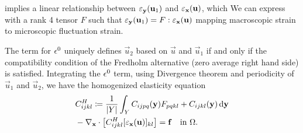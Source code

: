\documentclass[twocolumn,10pt]{article}
\begin{document}
 implies a linear relationship between
$\varepsilon_{\mathbf y}(\mathbf u_1)$ and $\varepsilon_{\mathbf x}(\mathbf u)$, which We can express
with a rank 4 tensor $F$ such that $\varepsilon_{\mathbf y}(\mathbf u_1) =
F:\varepsilon_{\mathbf x}(\mathbf u)$ mapping macroscopic strain to microscopic
fluctuation strain.

The term for $\epsilon^0$ uniquely defines $\vec{u}_2$ based on $\vec{u}$
and $\vec{u}_1$ if and only if the compatibility condition of the
Fredholm alternative (zero average right hand side) is
satisfied. Integrating the $\epsilon^0$ term, using Divergence theorem and
periodicity of $\vec{u}_1$ and $\vec{u}_2$, we have the homogenized
elasticity equation
\begin{align}
  &C^H_{ijkl} \coloneqq \frac{1}{|Y|} \int_Y C_{ijpq}({\mathbf y}) F_{pqkl} + C_{ijkl}({\mathbf y}) \, \mathrm{d} {\mathbf y}\\
  &-\nabla_{\mathbf x} \cdot \left[ C^H_{ijkl} [\varepsilon_{\mathbf x}(\mathbf u)]_{kl} \right] = \mathbf f \quad \text{in } \Omega.
\end{align}
\end{document}
